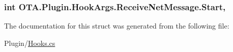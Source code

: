 \subsubsection[{Start}]{\setlength{\rightskip}{0pt plus 5cm}int O\+T\+A.\+Plugin.\+Hook\+Args.\+Receive\+Net\+Message.\+Start\hspace{0.3cm}{\ttfamily [get]}, {\ttfamily [set]}}\label{struct_o_t_a_1_1_plugin_1_1_hook_args_1_1_receive_net_message_a621ac035dfab0557d8940b3b64b562a3}


The documentation for this struct was generated from the following file\+:\begin{DoxyCompactItemize}
\item 
Plugin/\hyperlink{_hooks_8cs}{Hooks.\+cs}\end{DoxyCompactItemize}
